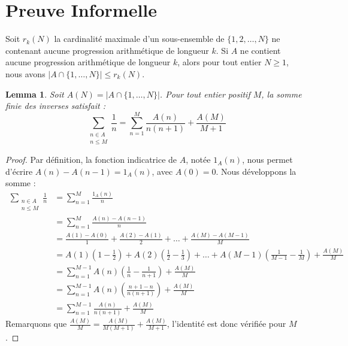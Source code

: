 \documentclass[11pt, a4paper]{article}
\newtheorem{lemma}[theorem]{Lemma}
\begin{document}
\section{Preuve Informelle}
Soit $r_k(N)$ la cardinalité maximale d'un sous-ensemble de $\{1, 2, \dots, N\}$ ne contenant aucune progression arithmétique de longueur $k$. Si $A$ ne contient aucune progression arithmétique de longueur $k$, alors pour tout entier $N \ge 1$, nous avons $|A \cap \{1, \dots, N\}| \le r_k(N)$.

\begin{lemma}
Soit $A(N) = |A \cap \{1, \dots, N\}|$. Pour tout entier positif $M$, la somme finie des inverses satisfait :
$$ \sum_{\substack{n \in A \\ n \le M}} \frac{1}{n} = \sum_{n=1}^M \frac{A(n)}{n(n+1)} + \frac{A(M)}{M+1} $$
\end{lemma}
\begin{proof}
Par définition, la fonction indicatrice de $A$, notée $1_A(n)$, nous permet d'écrire $A(n) - A(n-1) = 1_A(n)$, avec $A(0)=0$. Nous développons la somme :
\begin{align*}
\sum_{\substack{n \in A \\ n \le M}} \frac{1}{n} &= \sum_{n=1}^M \frac{1_A(n)}{n} \\
&= \sum_{n=1}^M \frac{A(n) - A(n-1)}{n} \\
&= \frac{A(1) - A(0)}{1} + \frac{A(2) - A(1)}{2} + \dots + \frac{A(M) - A(M-1)}{M} \\
&= A(1)\left(1 - \frac{1}{2}\right) + A(2)\left(\frac{1}{2} - \frac{1}{3}\right) + \dots + A(M-1)\left(\frac{1}{M-1} - \frac{1}{M}\right) + \frac{A(M)}{M} \\
&= \sum_{n=1}^{M-1} A(n) \left( \frac{1}{n} - \frac{1}{n+1} \right) + \frac{A(M)}{M} \\
&= \sum_{n=1}^{M-1} A(n) \left( \frac{n+1 - n}{n(n+1)} \right) + \frac{A(M)}{M} \\
&= \sum_{n=1}^{M-1} \frac{A(n)}{n(n+1)} + \frac{A(M)}{M}
\end{align*}
Remarquons que $\frac{A(M)}{M} = \frac{A(M)}{M(M+1)} + \frac{A(M)}{M+1}$, l'identité est donc vérifiée pour $M$.
\end{proof}
\end{document}
